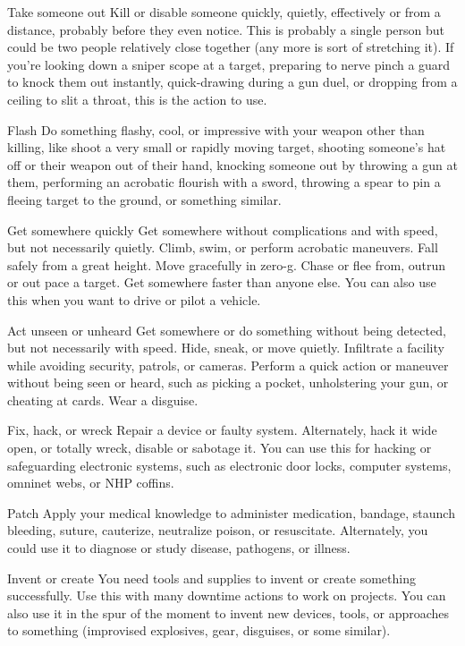                                                                                                                    


Take someone out  
Kill or disable someone quickly, quietly, effectively or from a distance, probably before they even  
notice. This is probably a single person but could be two people relatively close together (any  
more is sort of stretching it). If you’re looking down a sniper scope at a target, preparing to nerve  
pinch a guard to knock them out instantly, quick-drawing during a gun duel, or dropping from a  
ceiling to slit a throat, this is the action to use.  

Flash  
Do something flashy, cool, or impressive with your weapon other than killing, like shoot a very  
small or rapidly moving target, shooting someone’s hat off or their weapon out of their hand,  
knocking someone out by throwing a gun at them, performing an acrobatic flourish with a sword,  
throwing a spear to pin a fleeing target to the ground, or something similar.  

Get somewhere quickly  
Get somewhere without complications and with speed, but not necessarily quietly. Climb, swim, or  
perform acrobatic maneuvers. Fall safely from a great height. Move gracefully in zero-g. Chase or  
flee from, outrun or out pace a target. Get somewhere faster than anyone else. You can also use  
this when you want to drive or pilot a vehicle.   

Act unseen or unheard  
Get somewhere or do something without being detected, but not necessarily with speed. Hide,  
sneak, or move quietly. Infiltrate a facility while avoiding security, patrols, or cameras. Perform a  
quick action or maneuver without being seen or heard, such as picking a pocket, unholstering  
your gun, or cheating at cards. Wear a disguise.  

Fix, hack, or wreck   
Repair a device or faulty system. Alternately, hack it wide open, or totally wreck, disable or  
sabotage it. You can use this for hacking or safeguarding electronic systems, such as electronic  
door locks, computer systems, omninet webs, or NHP coffins.  

Patch  
Apply your medical knowledge to administer medication, bandage, staunch bleeding, suture,  
cauterize, neutralize poison, or resuscitate. Alternately, you could use it to diagnose or study  
disease, pathogens, or illness.  

Invent or create  
You need tools and supplies to invent or create something successfully. Use this with many  
downtime actions to work on projects. You can also use it in the spur of the moment to invent new  
devices, tools, or approaches to something (improvised explosives, gear, disguises, or some  
similar).  

